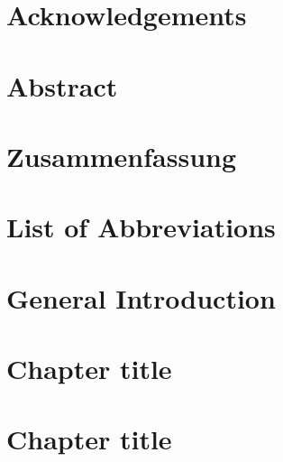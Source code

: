 \documentclass[english,11pt,twoside,list=totoc]{book}
\begin{document}
	
\frontmatter
\pagestyle{empty}

	\chapter*{}
				
	\chapter*{}
		
	\chapter*{Acknowledgements}
	\chapter*{Abstract}
		
	\chapter*{Zusammenfassung}
		
\pagestyle{fancy}

	\tableofcontents
	\listoffigures
	\listoftables
	\chapter*{List of Abbreviations}
		
	
	
\mainmatter	
	\chapter{General Introduction}
			
	\chapter{Chapter title} %
			
	\chapter{Chapter title} %
			
\end{document}
